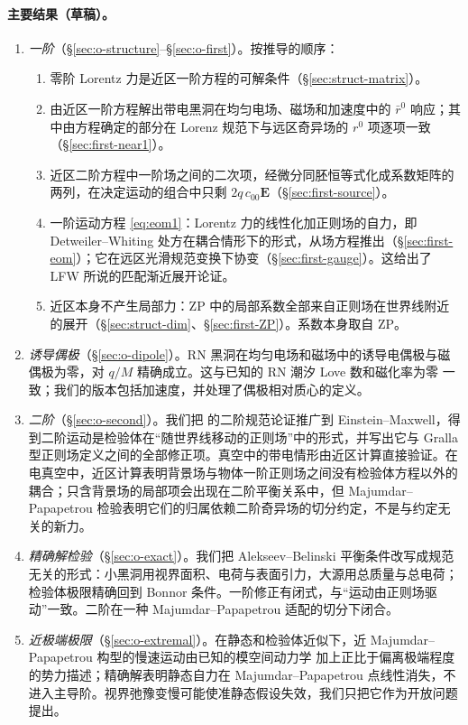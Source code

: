 \documentclass[11pt,a4paper]{ctexart}
\begin{document}
\paragraph{主要结果（草稿）。}
\begin{enumerate}[nosep]
\item \emph{一阶}（\S\ref{sec:o-structure}--\S\ref{sec:o-first}）。按推导的顺序：
  \begin{enumerate}[nosep,label=(\alph*)]
  \item 零阶 Lorentz 力是近区一阶方程的可解条件（\S\ref{sec:struct-matrix}）。
  \item 由近区一阶方程解出带电黑洞在均匀电场、磁场和加速度中的 $\bar r^0$ 响应；其中由方程确定的部分在 Lorenz 规范下与远区奇异场的 $r^0$ 项逐项一致（\S\ref{sec:first-near1}）。
  \item 近区二阶方程中一阶场之间的二次项，经微分同胚恒等式化成系数矩阵的两列，在决定运动的组合中只剩 $2q\,c_{00}\boldsymbol E$（\S\ref{sec:first-source}）。
  \item 一阶运动方程 \eqref{eq:eom1}：Lorentz 力的线性化加正则场的自力，即 Detweiler--Whiting 处方在耦合情形下的形式，从场方程推出（\S\ref{sec:first-eom}）；它在远区光滑规范变换下协变（\S\ref{sec:first-gauge}）。这给出了 LFW 所说的匹配渐近展开论证。
  \item 近区本身不产生局部力：ZP 中的局部系数全部来自正则场在世界线附近的展开（\S\ref{sec:struct-dim}、\S\ref{sec:first-ZP}）。系数本身取自 ZP。
  \end{enumerate}
\item \emph{诱导偶极}（\S\ref{sec:o-dipole}）。RN 黑洞在均匀电场和磁场中的诱导电偶极与磁偶极为零，对 $q/M$ 精确成立。这与已知的 RN 潮汐 Love 数和磁化率为零 \citep{CardosoEtAl2017,PereniguezCardoso2022} 一致；我们的版本包括加速度，并处理了偶极相对质心的定义。
\item \emph{二阶}（\S\ref{sec:o-second}）。我们把 \citet{Gralla2012} 的二阶规范论证推广到 Einstein--Maxwell，得到二阶运动是检验体在“随世界线移动的正则场”中的形式，并写出它与 Gralla 型正则场定义之间的全部修正项。真空中的带电情形由近区计算直接验证。在电真空中，近区计算表明背景场与物体一阶正则场之间没有检验体方程以外的耦合；只含背景场的局部项会出现在二阶平衡关系中，但 Majumdar--Papapetrou 检验表明它们的归属依赖二阶奇异场的切分约定，不是与约定无关的新力。
\item \emph{精确解检验}（\S\ref{sec:o-exact}）。我们把 Alekseev--Belinski 平衡条件改写成规范无关的形式：小黑洞用视界面积、电荷与表面引力，大源用总质量与总电荷；检验体极限精确回到 Bonnor 条件。一阶修正有闭式，与“运动由正则场驱动”一致。二阶在一种 Majumdar--Papapetrou 适配的切分下闭合。
\item \emph{近极端极限}（\S\ref{sec:o-extremal}）。在静态和检验体近似下，近 Majumdar--Papapetrou 构型的慢速运动由已知的模空间动力学 \citep{FerrellEardley1987} 加上正比于偏离极端程度的势力描述；精确解表明静态自力在 Majumdar--Papapetrou 点线性消失，不进入主导阶。视界弛豫变慢可能使准静态假设失效，我们只把它作为开放问题提出。
\end{enumerate}
\end{document}
